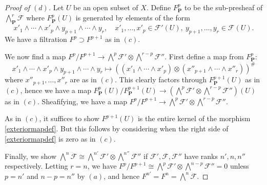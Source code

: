 \documentclass[10pt]{article}
\theoremstyle{definition}
\theoremstyle{remark}
\numberwithin{equation}{section}
\numberwithin{figure}{subsubsection}
\newcommand{\FF}{\mathscr{F}}
\newcommand{\PP}{\mathbf{P}}
\begin{document}
\begin{proof}[Proof of $(d)$]
  Let $U$ be an open subset of $X$. Define $F^p_{\PP}$ to be the sub-presheaf of $\bigwedge^r_\PP \FF$ where $F^p_\PP(U)$ is generated by elements of the form
  \begin{equation*}
    x'_1 \wedge \cdots \wedge x'_p \wedge y_{p+1} \wedge \cdots \wedge y_r, \quad x'_1,\ldots,x'_p \in \FF'(U),~y_{p+1},\ldots,y_r \in \FF(U).
  \end{equation*}
  We have a filtration $F^p \supset F^{p+1}$ as in $(c)$.
  \par We now find a map $F^p/F^{p+1} \to \bigwedge^p \FF' \otimes \bigwedge^{r-p}\FF''$. First define a map from $F^p_\PP$:
  \begin{equation}\label{exteriormapdef}
    x'_1 \wedge \cdots \wedge x'_p \wedge y_{p+1} \wedge \cdots \wedge y_r \mapsto \left((x'_1 \wedge \cdots \wedge x'_p) \otimes (x''_{p+1} \wedge \cdots \wedge x''_r)\right)^\#
  \end{equation}
  where $x''_{p+1},\ldots,x''_r$ are as in $(c)$. This clearly factors through $F_\PP^{p+1}(U)$ as in $(c)$, hence we have a map $F^p_\PP(U)/F^{p+1}_\PP(U) \to \left(\bigwedge^p \FF' \otimes \bigwedge^{r-p}\FF''\right)(U)$ as in $(c)$. Sheafifying, we have a map $F^p/F^{p+1} \to \bigwedge^p \FF' \otimes \bigwedge^{r-p}\FF''$.
  \par As in $(c)$, it suffices to show $F^{p+1}(U)$ is the entire kernel of the morphism \eqref{exteriormapdef}. But this follows by considering when the right side of \eqref{exteriormapdef} is zero as in $(c)$.
  \par Finally, we show $\bigwedge^n\FF \cong \bigwedge^{n'}\FF' \otimes \bigwedge^{n''}\FF''$ if $\FF',\FF,\FF''$ have ranks $n',n,n''$ respectively. Letting $r = n$, we have $F^p/F^{p+1} \cong \bigwedge^p\FF' \otimes \bigwedge^{n-p} \FF'' = 0$ unless $p = n'$ and $n-p = n''$ by $(a)$, and hence $F^{n'} = F^n = \bigwedge^n\FF$.
\end{proof}
\end{document}
